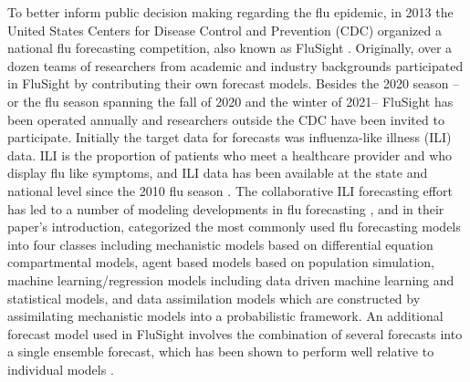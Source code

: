 \documentclass[ba]{imsart}
\theoremstyle{plain}
\theoremstyle{definition}
\theoremstyle{remark}
\begin{document}
To better inform public decision making regarding the flu epidemic, in 2013 the United States Centers for Disease Control and Prevention (CDC) organized a national flu forecasting competition, also known as FluSight \cite[]{biggerstaff2016results, mathis2024evaluation,cdcfluforecasting2024}. Originally, over a dozen teams of researchers from academic and industry backgrounds participated in FluSight by contributing their own forecast models. Besides the 2020 season --or the flu season spanning the fall of 2020 and the winter of 2021-- FluSight has been operated annually and researchers outside the CDC have been invited to participate. Initially the target data for forecasts was influenza-like illness (ILI) data. ILI is the proportion of patients who meet a healthcare provider and who display flu like symptoms, and ILI data has been available at the state and national level since the 2010 flu season \cite[]{cdcfluview2023,cdc2024fluviewportal}. 
The collaborative ILI forecasting effort has led to a number of modeling developments in flu forecasting \cite[see references therein for more examples]{mcandrew2021adaptively, osthus2021multiscale, osthus2019dynamic, ulloa2019}, and in their paper's introduction, \cite{osthus2019dynamic} categorized the most commonly used flu forecasting models into four classes including mechanistic models based on differential equation compartmental models, agent based models based on population simulation, machine learning/regression models including data driven machine learning and statistical models, and data assimilation models which are constructed by assimilating mechanistic models into a probabilistic framework. An additional forecast model used in FluSight involves the combination of several forecasts into a single ensemble forecast, which has been shown to perform well relative to individual models \cite[]{mcandrew2021adaptively, ray2020ensemble, yamana2016superensemble}.
\end{document}
